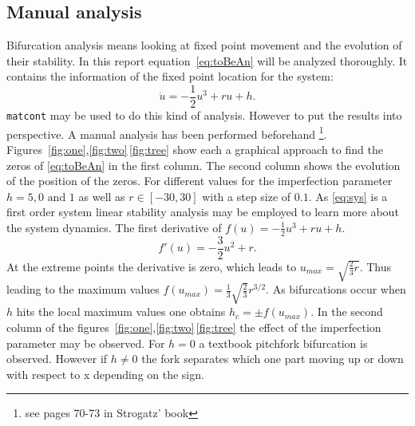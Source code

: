 \subsection{Manual analysis}
Bifurcation analysis means looking at fixed point movement and the evolution of their stability. In this report equation~\ref{eq:toBeAn} will be analyzed thoroughly. It contains the information of the fixed point location for the system:
\begin{equation}
\dot{u} = -\frac{1}{2} u^3 + ru + h. 
\label{eq:sys} 
\end{equation}
\texttt{matcont} may be used to do this kind of analysis. However to put the results into perspective. A manual analysis has been performed beforehand \footnote{see pages 70-73 in Strogatz' book}. Figures~\ref{fig:one},\ref{fig:two}\,\ref{fig:tree} show each a graphical approach to find the zeros of \ref{eq:toBeAn} in the first column. The second column shows the evolution of the position of the zeros. For different values for the imperfection parameter $h = 5,0 \text{ and } 1$ as well as $r \in [-30,30]$ with a step size of $0.1$.
As \ref{eq:sys} is a first order system linear stability analysis may be employed to learn more about the system dynamics. The first derivative of $f(u) = -\frac{1}{2} u^3 + ru + h$. 
\begin{equation}
f'(u) = -\frac{3}{2}u^2 + r.
\end{equation}
At the extreme points the derivative is zero, which leads to $u_{max} = \sqrt{\frac{2}{3}r}$. Thus leading to the maximum values $f(u_{max})= \frac{1}{3} \sqrt{\frac{2}{3}}r^{3/2}$. As bifurcations occur when $h$ hits the local maximum values one obtains $h_c = \pm f(u_{max})$. In the second column of the figures~\ref{fig:one},\ref{fig:two}\,\ref{fig:tree} the effect of the imperfection parameter may be observed. For $h = 0$ a textbook pitchfork bifurcation is observed. However if $h \ne 0$ the fork separates which one part moving up or down with respect to x depending on the sign.
